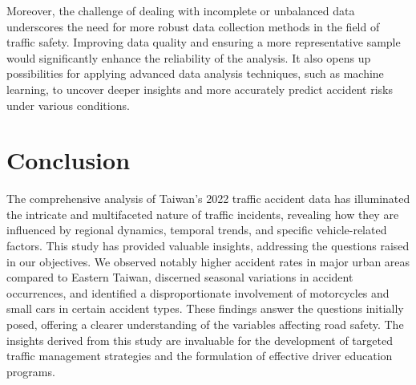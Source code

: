 \documentclass[a4paper, oneside, final, 12pt]{scrartcl} %
\begin{document}
Moreover, the challenge of dealing with incomplete or unbalanced data underscores 
the need for more robust data collection methods in the field of traffic safety. 
Improving data quality and ensuring a more representative sample would significantly 
enhance the reliability of the analysis. It also opens up possibilities for 
applying advanced data analysis techniques, such as machine learning, 
to uncover deeper insights and more accurately predict accident risks under various conditions.

\section{Conclusion}

The comprehensive analysis of Taiwan's 2022 traffic accident data has illuminated 
the intricate and multifaceted nature of traffic incidents, 
revealing how they are influenced by regional dynamics, temporal trends, 
and specific vehicle-related factors. This study has provided valuable insights, 
addressing the questions raised in our objectives. 
We observed notably higher accident rates in major urban areas compared to Eastern Taiwan, 
discerned seasonal variations in accident occurrences, 
and identified a disproportionate involvement of motorcycles and small cars in 
certain accident types. These findings answer the questions initially posed, 
offering a clearer understanding of the variables affecting road safety. 
The insights derived from this study are invaluable for the development of 
targeted traffic management strategies and the formulation of effective driver 
education programs. 



\endgroup

\end{document}
